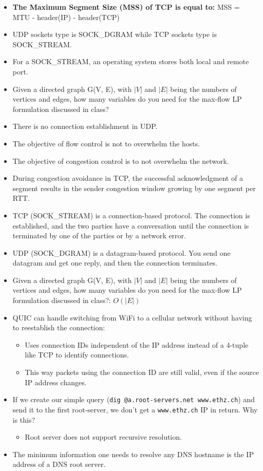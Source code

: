 \documentclass{article}
\begin{document}
\begin{itemize}
    \item \textbf{The Maximum Segment Size (MSS) of TCP is equal to:}
    MSS = MTU - header(IP) - header(TCP)
    \item UDP sockets type is SOCK\_DGRAM while TCP sockets type is SOCK\_STREAM.
    \item For a SOCK\_STREAM, an operating system stores both local and remote port.
    \item Given a directed graph G(V, E), with \(|V|\) and \(|E|\) being the numbers of vertices and edges, how many variables do you need for the max-flow LP formulation discussed in class?
    \item There is no connection establishment in UDP.
    \item The objective of flow control is not to overwhelm the hosts.
    \item The objective of congestion control is to not overwhelm the network.
    \item During congestion avoidance in TCP, the successful acknowledgment of a segment results in the sender congestion window growing by one segment per RTT.
    \item TCP (SOCK\_STREAM) is a connection-based protocol. The connection is established, and the two parties have a conversation until the connection is terminated by one of the parties or by a network error.
    \item UDP (SOCK\_DGRAM) is a datagram-based protocol. You send one datagram and get one reply, and then the connection terminates.
    \item Given a directed graph G(V, E), with \(|V|\) and \(|E|\) being the numbers of vertices and edges, how many variables do you need for the max-flow LP formulation discussed in class?: \(O(|E|)\)
    \item QUIC can handle switching from WiFi to a cellular network without having to reestablish the connection:
    \begin{itemize}
        \item Uses connection IDs independent of the IP address instead of a 4-tuple like TCP to identify connections.
        \item This way packets using the connection ID are still valid, even if the source IP address changes.
    \end{itemize}
    \item If we create our simple query (\texttt{dig @a.root-servers.net www.ethz.ch}) and send it to the first root-server, we don’t get a \texttt{www.ethz.ch} IP in return. Why is this?
    \begin{itemize}
        \item Root server does not support recursive resolution.
    \end{itemize}
    \item The minimum information one needs to resolve any DNS hostname is the IP address of a DNS root server.
\end{itemize}
\end{document}
